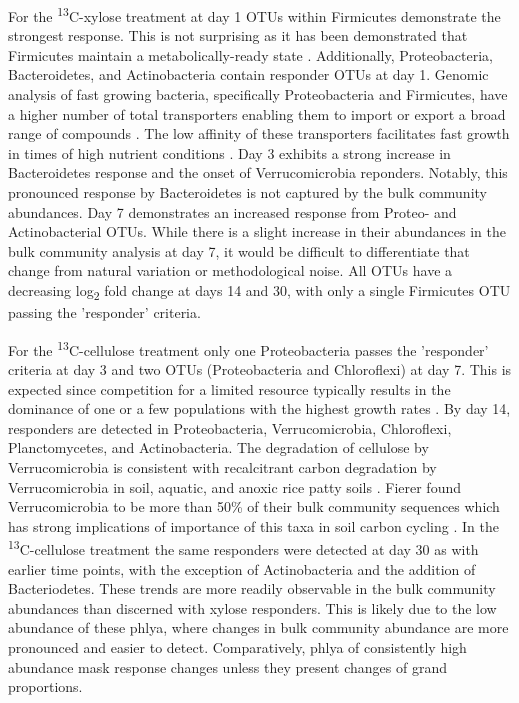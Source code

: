 For the \textsuperscript{13}C-xylose treatment at day 1 OTUs within Firmicutes demonstrate the strongest response. This is not surprising as it has been demonstrated that Firmicutes maintain a metabolically-ready state \cite{Jenkins_2010}\cite{Griffiths_1998}\cite{Brookes_1987}\cite{De_Nobili_2001}. Additionally, Proteobacteria, Bacteroidetes, and Actinobacteria contain responder OTUs at day 1. Genomic analysis of fast growing bacteria, specifically Proteobacteria and Firmicutes, have a higher number of total transporters enabling them to import or export a broad range of compounds \cite{Barabote_2005}. The low affinity of these transporters facilitates fast growth in times of high nutrient conditions \cite{Trivedi_2013}.  Day 3 exhibits a strong increase in Bacteroidetes response and the onset of Verrucomicrobia reponders. Notably, this pronounced response by Bacteroidetes is not captured by the bulk community abundances. Day 7 demonstrates an increased response from Proteo- and Actinobacterial OTUs.  While there is a slight increase in their abundances in the bulk community analysis at day 7, it would be difficult to differentiate that change from natural variation or methodological noise. All OTUs have a decreasing log\textsubscript{2} fold change at days 14 and 30, with only a single Firmicutes OTU passing the 'responder' criteria.     

For the \textsuperscript{13}C-cellulose treatment only one Proteobacteria passes the 'responder' criteria at day 3 and two OTUs (Proteobacteria and Chloroflexi) at day 7. This is expected since competition for a limited resource typically results in the dominance of one or a few populations with the highest growth rates \cite{Fontaine_2003}. By day 14, responders are detected in Proteobacteria, Verrucomicrobia, Chloroflexi, Planctomycetes, and Actinobacteria. The degradation of cellulose by Verrucomicrobia is consistent with recalcitrant carbon degradation by Verrucomicrobia in soil, aquatic, and anoxic rice patty soils  \cite{Fierer_2013}\cite{Herlemann_2013}\cite{10543821}. Fierer found Verrucomicrobia to be more than 50\% of their bulk community sequences which has strong implications of importance of this taxa in soil carbon cycling \cite{Fierer_2013}. 
In the \textsuperscript{13}C-cellulose treatment the same responders were detected at day 30 as with earlier time points, with the exception of Actinobacteria and the addition of Bacteriodetes. These trends are more readily observable in the bulk community abundances than discerned with xylose responders. This is likely due to the low abundance of these phlya, where changes in bulk community abundance are more pronounced and easier to detect. Comparatively, phlya of consistently high abundance mask response changes unless they present changes of grand proportions.          

